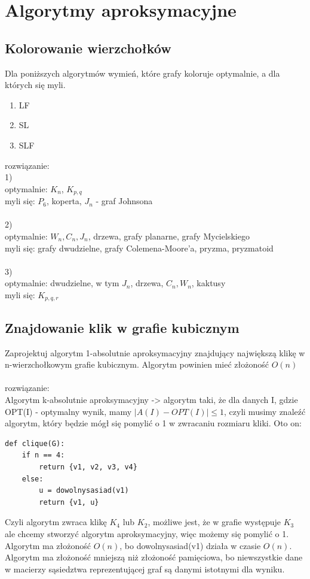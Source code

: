 \documentclass{article}
\begin{document}
\section{Algorytmy aproksymacyjne}
\subsection*{Kolorowanie wierzchołków}
Dla poniższych algorytmów wymień, które grafy koloruje optymalnie, a dla których się myli.
\begin{enumerate}
	\item LF
	\item SL
	\item SLF
\end{enumerate}
rozwiązanie: \\
1)\\
optymalnie: $K_n$, $K_{p,q}$ \\
myli się: $P_6$, koperta,  $J_n$ - graf Johnsona \\\\
2)\\
optymalnie: $W_n, C_n, J_n$, drzewa, grafy planarne, grafy Mycielskiego \\
myli się: grafy dwudzielne, grafy Colemena-Moore'a, pryzma,  pryzmatoid \\\\
3)\\
optymalnie: dwudzielne, w tym $J_n$, drzewa, $C_n, W_n$, kaktusy \\
myli się: $K_{p,q,r}$

\subsection*{Znajdowanie klik w grafie kubicznym}
Zaprojektuj algorytm 1-absolutnie aproksymacyjny znajdujący największą klikę w n-wierzchołkowym grafie kubicznym. Algorytm powinien mieć złożoność $O(n)$ \\\\rozwiązanie:\\
Algorytm k-absolutnie aproksymacyjny -> algorytm taki, że dla danych I, gdzie OPT(I) - optymalny wynik, mamy $|A(I) - OPT(I)| \leq 1$, czyli musimy znaleźć algorytm, 
który będzie mógł się pomylić o 1 w zwracaniu rozmiaru kliki. Oto on:

\begin{lstlisting}
def clique(G):
	if n == 4:
		return {v1, v2, v3, v4}
	else:
		u = dowolnysasiad(v1)
		return {v1, u}
\end{lstlisting}
Czyli algorytm zwraca klikę $K_4$ lub $K_2$,  możliwe jest, że w grafie występuje $K_3$ ale chcemy stworzyć algorytm aproksymacyjny, więc możemy się pomylić o 1.
Algorytm ma złożoność $O(n)$, bo dowolnysasiad(v1) działa w czasie $O(n)$. Algorytm ma złożoność mniejszą niż złożoność pamięciowa, bo niewszystkie dane w macierzy 
sąsiedztwa reprezentującej graf są danymi istotnymi dla wyniku.
\end{document}
